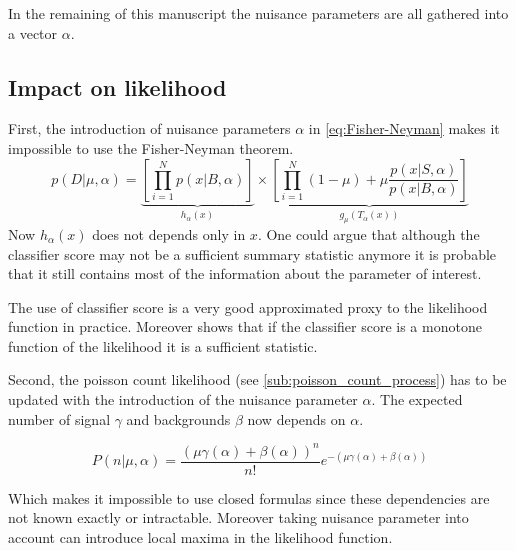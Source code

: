
In the remaining of this manuscript the nuisance parameters are all gathered into a vector $\alpha$.




\subsection{Impact on likelihood} %
\label{sub:impact_on_likelihood}


First, the introduction of nuisance parameters $\alpha$ in \autoref{eq:Fisher-Neyman} makes it impossible to use the Fisher-Neyman theorem.
\begin{equation}
	p(D|\mu, \alpha) = \underbrace{\left[ \prod_{i=1}^N p(x|B, \alpha) \right ]}_{h_\alpha(x)} \times 
       \underbrace{\left [\prod_{i=1}^N (1-\mu) + \mu \frac{p(x|S, \alpha)}{p(x|B, \alpha)} \right ]}_{g_\mu(T_\alpha(x))}
\end{equation}
Now $h_\alpha(x)$ does not depends only in $x$.
One could argue that although the classifier score may not be a sufficient summary statistic anymore it is probable that it still contains most of the information about the parameter of interest.

The use of classifier score is a very good approximated proxy to the likelihood function in practice.
Moreover \cite{Cranmer2015} shows that if the classifier score is a monotone function of the likelihood it is a sufficient statistic.

Second, the poisson count likelihood (see \autoref{sub:poisson_count_process}) has to be updated with the introduction of the nuisance parameter $\alpha$.
The expected number of signal $\gamma$ and backgrounds $\beta$ now depends on $\alpha$.

\begin{equation}
	P(n| \mu, \alpha) = \frac{(\mu \gamma(\alpha) +\beta(\alpha))^n }{n!} e^{-(\mu \gamma(\alpha) +\beta(\alpha))}
\end{equation}

Which makes it impossible to use closed formulas since these dependencies are not known exactly or intractable.
Moreover taking nuisance parameter into account can introduce local maxima in the likelihood function.


